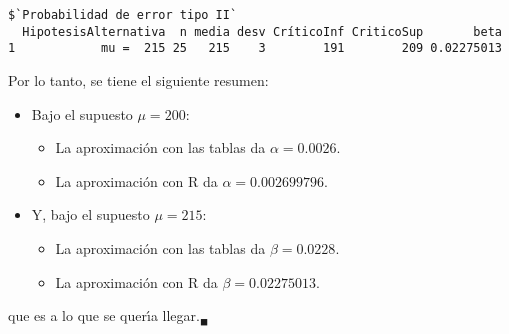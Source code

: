 \begin{solucion}
\begin{verbatim}
$`Probabilidad de error tipo II`
  HipotesisAlternativa  n media desv CríticoInf CriticoSup       beta
1            mu =  215 25   215    3        191        209 0.02275013
 \end{verbatim}
 \vspace{-0.5cm}
 Por lo tanto, se tiene el siguiente resumen:
 \begin{itemize}
  \item Bajo el supuesto $\mu = 200$:
  \begin{itemize}
   \item La aproximaci\'on con las tablas da $\alpha = 0.0026$.
   \item La aproximaci\'on con R da $\alpha = 0.002699796$.
  \end{itemize}
  \item Y, bajo el supuesto $\mu = 215$:
  \begin{itemize}
   \item La aproximaci\'on con las tablas da $\beta = 0.0228$.
   \item La aproximaci\'on con R da $\beta = 0.02275013$.
  \end{itemize}
 \end{itemize}
 que es a lo que se quer\'{\i}a llegar.${}_{\blacksquare}$
\end{solucion}
